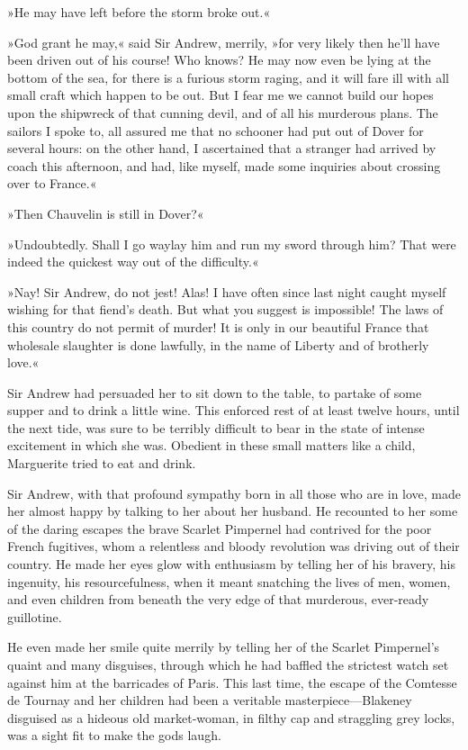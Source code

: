 »He may have left before the storm broke out.«

»God grant he may,« said Sir Andrew, merrily, »for very likely then he'll have been driven out of his course! Who knows? He may now even be lying at the bottom of the sea, for there is a furious storm raging, and it will fare ill with all small craft which happen to be out. But I fear me we cannot build our hopes upon the shipwreck of that cunning devil, and of all his murderous plans. The sailors I spoke to, all assured me that no schooner had put out of Dover for several hours: on the other hand, I ascertained that a stranger had arrived by coach this afternoon, and had, like myself, made some inquiries about crossing over to France.«

»Then Chauvelin is still in Dover?«

»Undoubtedly. Shall I go waylay him and run my sword through him? That were indeed the quickest way out of the difficulty.«

»Nay! Sir Andrew, do not jest! Alas! I have often since last night caught myself wishing for that fiend's death. But what you suggest is impossible! The laws of this country do not permit of murder! It is only in our beautiful France that wholesale slaughter is done lawfully, in the name of Liberty and of brotherly love.«

Sir Andrew had persuaded her to sit down to the table, to partake of some supper and to drink a little wine. This enforced rest of at least twelve hours, until the next tide, was sure to be terribly difficult to bear in the state of intense excitement in which she was. Obedient in these small matters like a child, Marguerite tried to eat and drink.

Sir Andrew, with that profound sympathy born in all those who are in love, made her almost happy by talking to her about her husband. He recounted to her some of the daring escapes the brave Scarlet Pimpernel had contrived for the poor French fugitives, whom a relentless and bloody revolution was driving out of their country. He made her eyes glow with enthusiasm by telling her of his bravery, his ingenuity, his resourcefulness, when it meant snatching the lives of men, women, and even children from beneath the very edge of that murderous, ever-ready guillotine.

He even made her smile quite merrily by telling her of the Scarlet Pimpernel's quaint and many disguises, through which he had baffled the strictest watch set against him at the barricades of Paris. This last time, the escape of the Comtesse de Tournay and her children had been a veritable masterpiece\allowbreak---\allowbreak Blakeney disguised as a hideous old market-woman, in filthy cap and straggling grey locks, was a sight fit to make the gods laugh.

